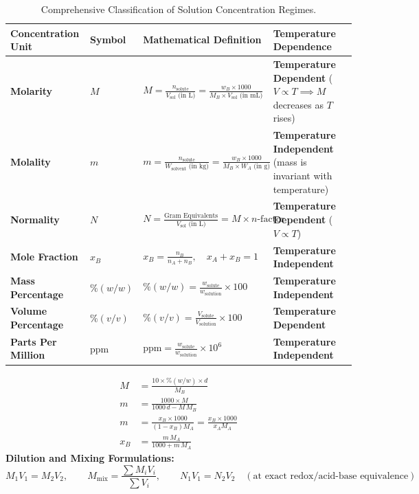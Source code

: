 \documentclass[10pt,a4paper]{article}
\begin{document}
\begin{table}[htbp]
\centering
\small
\renewcommand{\arraystretch}{1.3}
\begin{tabularx}{\textwidth}{p{3.2cm} p{2.2cm} p{4.2cm} p{4.8cm}}
\toprule
\textbf{Concentration Unit} & \textbf{Symbol} & \textbf{Mathematical Definition} & \textbf{Temperature Dependence} \\
\midrule
\textbf{Molarity} & $M$ & $M = \frac{n_{\text{solute}}}{V_{\text{sol}}\text{ (in L)}} = \frac{w_B \times 1000}{M_B \times V_{\text{sol}}\text{ (in mL)}}$ & \textbf{Temperature Dependent} ($V \propto T \implies M$ decreases as $T$ rises) \\
\textbf{Molality} & $m$ & $m = \frac{n_{\text{solute}}}{W_{\text{solvent}}\text{ (in kg)}} = \frac{w_B \times 1000}{M_B \times W_A\text{ (in g)}}$ & \textbf{Temperature Independent} (mass is invariant with temperature) \\
\textbf{Normality} & $N$ & $N = \frac{\text{Gram Equivalents}}{V_{\text{sol}}\text{ (in L)}} = M \times n\text{-factor}$ & \textbf{Temperature Dependent} ($V \propto T$) \\
\textbf{Mole Fraction} & $x_B$ & $x_B = \frac{n_B}{n_A + n_B}, \quad x_A + x_B = 1$ & \textbf{Temperature Independent} \\
\textbf{Mass Percentage} & $\%(w/w)$ & $\%(w/w) = \frac{w_{\text{solute}}}{w_{\text{solution}}} \times 100$ & \textbf{Temperature Independent} \\
\textbf{Volume Percentage} & $\%(v/v)$ & $\%(v/v) = \frac{V_{\text{solute}}}{V_{\text{solution}}} \times 100$ & \textbf{Temperature Dependent} \\
\textbf{Parts Per Million} & $\text{ppm}$ & $\text{ppm} = \frac{w_{\text{solute}}}{w_{\text{solution}}} \times 10^6$ & \textbf{Temperature Independent} \\
\bottomrule
\end{tabularx}
\caption{Comprehensive Classification of Solution Concentration Regimes.}
\end{table}

\begin{formulabox}[Master Interconversion Formulations ($d = \text{density in }\si{g.mL^{-1}}$)]
\begin{align}
  M &= \frac{10 \times \%(w/w) \times d}{M_B} \\
  m &= \frac{1000 \times M}{1000\,d - M\,M_B} \\
  m &= \frac{x_B \times 1000}{(1 - x_B)M_A} = \frac{x_B \times 1000}{x_A M_A} \\
  x_B &= \frac{m\,M_A}{1000 + m\,M_A}
\end{align}
\textbf{Dilution and Mixing Formulations:}
\begin{equation}
  M_1 V_1 = M_2 V_2, \qquad M_{\text{mix}} = \frac{\sum M_i V_i}{\sum V_i}, \qquad N_1 V_1 = N_2 V_2 \quad (\text{at exact redox/acid-base equivalence})
\end{equation}
\end{formulabox}
\end{document}
